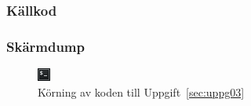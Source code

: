 \subsubsection{Källkod}
\label{src:uppg03}


\subsubsection{Skärmdump}
\begin{figure}[htbp]
    \centering
        \includegraphics[width=\linewidth]{img/03.png}
    \caption{Körning av koden till Uppgift~\ref{sec:uppg03}}
\label{fig:uppg03-screenshot}
\end{figure}

